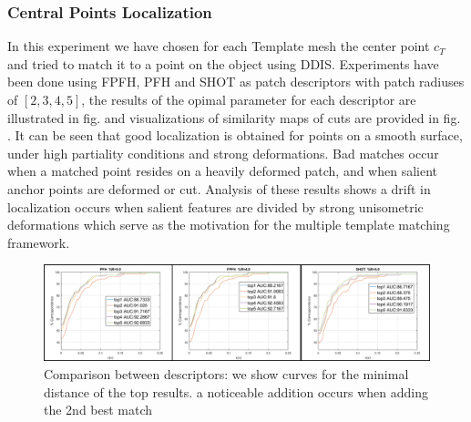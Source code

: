 \documentclass[10pt,twocolumn,letterpaper]{article}
\begin{document}
\subsubsection{Central Points Localization}
In this experiment we have chosen for each Template mesh the center point $c_T$ and tried to match it to a point on the object using DDIS. Experiments have been done using FPFH, PFH and SHOT as patch descriptors with patch radiuses of $[2,3,4,5]$, the results of the opimal parameter for each descriptor are illustrated in fig. and visualizations of similarity maps of cuts are provided in fig. . It can be seen that good localization is obtained for points on a smooth surface, under high partiality conditions and strong deformations. Bad matches occur when a matched point resides on a heavily deformed patch, and when salient anchor points are deformed or cut.  Analysis of these results shows a drift in localization occurs when salient features are divided by strong unisometric deformations which serve as the motivation for the multiple template matching framework.

\begin{figure}[htb]
	\centering

	\includegraphics[width=1\textwidth]{figures/ROCfigure.png}
	\caption{Comparison between descriptors: we show curves for the minimal distance of the top results. a noticeable addition occurs when adding the 2nd best match}
\end{figure}
\end{document}
